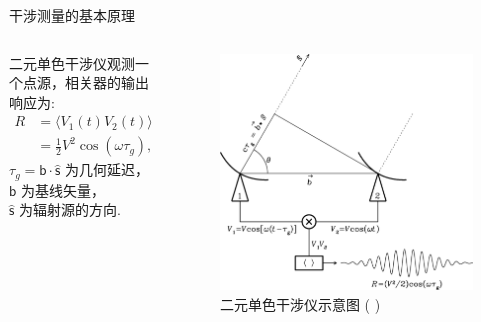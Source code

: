 \documentclass{beamer}
\newcommand{\B}[1]{\bm{\mathsf{#1}}}  %
\newcommand{\citeay}[1]{\citeauthor{#1} \citeyear{#1} \parencite{#1}}
\begin{document}
\begin{frame}{干涉测量的基本原理}
  \begin{columns}
    二元单色干涉仪观测一个点源，相关器的输出响应为:
    \begin{align}
      R & = \langle V_1(t) V_2(t) \rangle \\
        & = \frac{1}{2} V^2 \cos (\omega \tau_g) ,
    \end{align}
    $\tau_g = \B{b} \cdot \hat{\B{s}}$ 为几何延迟，\\
    $\B{b}$ 为基线矢量，\\
    $\hat{\B{s}}$ 为辐射源的方向.

    \begin{figure}
      \centering
      \includegraphics[width=\columnwidth]{interferometer}
      \caption{二元单色干涉仪示意图 (\citeay{condon2016})}
    \end{figure}
  \end{columns}
\end{frame}
\end{document}
